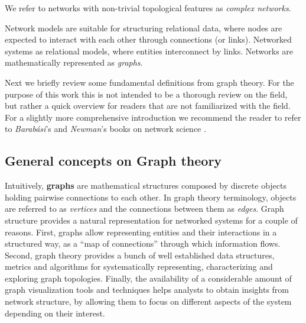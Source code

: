 We refer to networks with non-trivial topological features as \textit{complex networks}.






Network models are suitable for structuring relational data, where nodes are expected to interact with each other through connections (or links). 
Networked systems as relational models, where entities interconnect by links.
Networks are mathematically represented as \textit{graphs}.
 
 
Next we briefly review some fundamental definitions from graph theory.
For the purpose of this work this is not intended to be a thorough review on the field, but rather a quick overview for readers that are not familiarized with the field. 
For a slightly more comprehensive introduction we recommend the reader to refer to \textit{Barabási}'s and \textit{Newman}'s books on network science \cite{Barabasia, Newman2010b}.


\subsection{General concepts on Graph theory}

Intuitively, \textbf{graphs} are mathematical structures composed by discrete objects holding pairwise connections to each other. 
In graph theory terminology, objects are referred to as \textit{vertices} and the connections between them as \textit{edges}.
Graph structure provides a natural representation for networked systems for a couple of reasons.
First, graphs allow representing entities and their interactions in a structured way, as a ``map of connections'' through which information flows.
Second, graph theory provides a bunch of well established data structures, metrics and algorithms for systematically representing, characterizing and exploring graph topologies.
Finally, the availability of a considerable amount of graph visualization tools and techniques helps analysts to obtain insights from network structure, by allowing them to focus on different aspects of the system depending on their interest.

